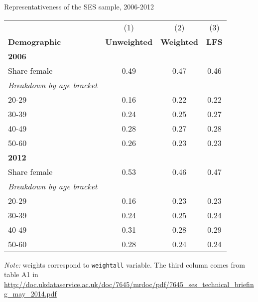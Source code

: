 \begin{center}
\begin{threeparttable}[!h]
\caption{Representativeness of the SES sample, 2006-2012}
\begin{tabular}{lccc}
\toprule
\toprule
&\multicolumn{1}{c}{(1)}&\multicolumn{1}{c}{(2)}&\multicolumn{1}{c}{(3)} \\
\textbf{Demographic}&\multicolumn{1}{c}{\textbf{Unweighted}}&\multicolumn{1}{c}{\textbf{Weighted}}&\multicolumn{1}{c}{\textbf{LFS}} \\
\midrule

\textbf{2006}\\
\midrule
Share female           	     &        0.49&        0.47 & 0.46\vspace{3mm}\\

\textit{Breakdown by age bracket}\\
\hspace{3mm}   20-29         &        0.16&        0.22& 0.22\\
\hspace{3mm}   30-39 		&        0.24&        0.25& 0.27\\
\hspace{3mm}   40-49        &        0.28&        0.27& 0.28\\
\hspace{3mm}   50-60           &        0.26&        0.23& 0.23\\
\midrule
\textbf{2012}\\
\midrule
Share female           		&        0.53&        0.46 & 0.47 \vspace{3mm}\\

\textit{Breakdown by age bracket}\\
\hspace{3mm}   20-29    	 &        0.16&        0.23& 0.23\\
\hspace{3mm}   30-39 		&        0.24&        0.25& 0.24\\
\hspace{3mm}   40-49            &        0.31&        0.28& 0.29\\
\hspace{3mm}   50-60           &        0.28&        0.24 & 0.24\\
\bottomrule
\bottomrule
\end{tabular}
\begin{tablenotes}
	\item \footnotesize{\textit{Note:} weights correspond to \texttt{weightall} variable. The third column comes from table A1 in \url{http://doc.ukdataservice.ac.uk/doc/7645/mrdoc/pdf/7645_ses_technical_briefing_may_2014.pdf}}
\end{tablenotes}
\end{threeparttable}
\end{center}
